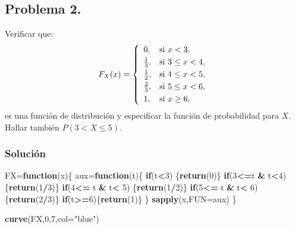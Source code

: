 \documentclass[
]{article}
\newenvironment{Shaded}{\begin{snugshade}}{\end{snugshade}}
\newcommand{\AttributeTok}[1]{\textcolor[rgb]{0.13,0.29,0.53}{#1}}
\newcommand{\ControlFlowTok}[1]{\textcolor[rgb]{0.13,0.29,0.53}{\textbf{#1}}}
\newcommand{\DecValTok}[1]{\textcolor[rgb]{0.00,0.00,0.81}{#1}}
\newcommand{\FunctionTok}[1]{\textcolor[rgb]{0.13,0.29,0.53}{\textbf{#1}}}
\newcommand{\NormalTok}[1]{#1}
\newcommand{\OtherTok}[1]{\textcolor[rgb]{0.56,0.35,0.01}{#1}}
\newcommand{\SpecialCharTok}[1]{\textcolor[rgb]{0.81,0.36,0.00}{\textbf{#1}}}
\newcommand{\StringTok}[1]{\textcolor[rgb]{0.31,0.60,0.02}{#1}}
\begin{document}
\subsection{Problema 2.}\label{problema-2.}

Verificar que: \[F_X (x)=
\left\{\begin{array}{ll}
0, & \mbox{si $x<3$},
 \\[0.1cm]
{1\over 3}, & \mbox{si $3\leq x<4$},
 \\[0.1cm]
{1\over 2}, & \mbox{si $4\leq x<5$},
 \\[0.1cm] 
{2\over 3}, & \mbox{si $5\leq x<6$},
 \\[0.1cm] 
1, & \mbox{si $x\geq 6$},
\end{array}\right.
\] es una función de distribución y especificar la función de
probabilidad para \(X\). Hallar también \(P(3<X\leq 5)\).

\subsubsection{Solución}\label{soluciuxf3n-1}

\begin{Shaded}
\begin{Highlighting}[]
\NormalTok{FX}\OtherTok{=}\ControlFlowTok{function}\NormalTok{(x)\{}
\NormalTok{  aux}\OtherTok{=}\ControlFlowTok{function}\NormalTok{(t)\{}
    \ControlFlowTok{if}\NormalTok{(t}\SpecialCharTok{\textless{}}\DecValTok{3}\NormalTok{) \{}\FunctionTok{return}\NormalTok{(}\DecValTok{0}\NormalTok{)\}}
    \ControlFlowTok{if}\NormalTok{(}\DecValTok{3}\SpecialCharTok{\textless{}=}\NormalTok{t }\SpecialCharTok{\&}\NormalTok{ t}\SpecialCharTok{\textless{}}\DecValTok{4}\NormalTok{) \{}\FunctionTok{return}\NormalTok{(}\DecValTok{1}\SpecialCharTok{/}\DecValTok{3}\NormalTok{)\}}
    \ControlFlowTok{if}\NormalTok{(}\DecValTok{4}\SpecialCharTok{\textless{}=}\NormalTok{ t }\SpecialCharTok{\&}\NormalTok{ t}\SpecialCharTok{\textless{}} \DecValTok{5}\NormalTok{) \{}\FunctionTok{return}\NormalTok{(}\DecValTok{1}\SpecialCharTok{/}\DecValTok{2}\NormalTok{)\}}
    \ControlFlowTok{if}\NormalTok{(}\DecValTok{5}\SpecialCharTok{\textless{}=}\NormalTok{ t }\SpecialCharTok{\&}\NormalTok{ t}\SpecialCharTok{\textless{}} \DecValTok{6}\NormalTok{) \{}\FunctionTok{return}\NormalTok{(}\DecValTok{2}\SpecialCharTok{/}\DecValTok{3}\NormalTok{)\}}
    \ControlFlowTok{if}\NormalTok{(t}\SpecialCharTok{\textgreater{}=}\DecValTok{6}\NormalTok{)\{}\FunctionTok{return}\NormalTok{(}\DecValTok{1}\NormalTok{)\}}
\NormalTok{    \}}
  \FunctionTok{sapply}\NormalTok{(x,}\AttributeTok{FUN=}\NormalTok{aux)}
\NormalTok{\}}

\FunctionTok{curve}\NormalTok{(FX,}\DecValTok{0}\NormalTok{,}\DecValTok{7}\NormalTok{,}\AttributeTok{col=}\StringTok{"blue"}\NormalTok{)}
\end{Highlighting}
\end{Shaded}
\end{document}
